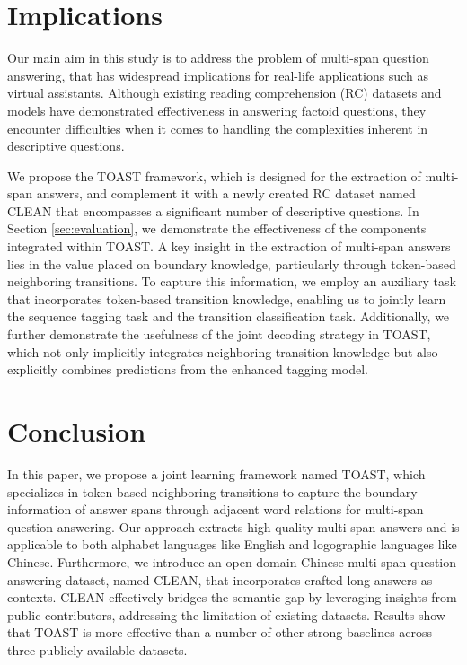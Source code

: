 \documentclass[a4paper]{cas-sc}
\newcommand{\1}[1]{\mathds{1}\left[#1\right]}
\newcommand{\secref}[1]{Section \ref{#1}}
\begin{document}
%	
\section{Implications}
Our main aim in this study is to address the problem of multi-span question answering, that has widespread implications for real-life applications such as virtual assistants. Although existing reading comprehension (RC) datasets and models have demonstrated effectiveness in answering factoid questions, they encounter difficulties when it comes to handling the complexities inherent in descriptive questions.

We propose the TOAST framework, which is designed for the extraction of multi-span answers, and complement it with a newly created RC dataset named CLEAN that encompasses a significant number of descriptive questions. In \secref{sec:evaluation}, we demonstrate the effectiveness of the components integrated within TOAST. A key insight in the extraction of multi-span answers lies in the value placed on boundary knowledge, particularly through token-based neighboring transitions. 
To capture this information, we employ an auxiliary task that incorporates token-based transition knowledge, enabling us to jointly learn the sequence tagging task and the transition classification task.
Additionally, we further demonstrate the usefulness of the joint decoding strategy in TOAST, which not only implicitly integrates neighboring transition knowledge but also explicitly combines predictions from the enhanced tagging model. 

\section{Conclusion}
\label{sec:conclusion}
In this paper, we propose a joint learning framework named TOAST, which specializes in token-based neighboring transitions to capture the boundary information of answer spans through adjacent word relations for multi-span question answering. Our approach extracts high-quality multi-span answers and is applicable to both alphabet languages like English and logographic languages like Chinese. Furthermore, we introduce an open-domain Chinese multi-span question answering dataset, named CLEAN, that incorporates crafted long answers as contexts. CLEAN effectively bridges the semantic gap by leveraging insights from public contributors, addressing the limitation of existing datasets. Results show that TOAST is more effective than a number of other strong baselines across three publicly available datasets.
\end{document}
